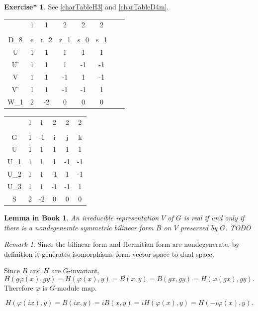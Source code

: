 \documentclass[12pt, letterpaper]{article}
\newcommand{\red}[1]{{\color{red} #1}}
\theoremstyle{definition}
\theoremstyle{remark}
\newtheorem*{rem*}{Remark}
\theoremstyle{definition}
\newtheorem{exe*}[exe]{Exercise*}
\theoremstyle{plain}
\newtheorem{llem}[exe]{Lemma in Book}
\numberwithin{equation}{section}
\begin{document}
	\begin{exe*}
		See \autoref{charTableH3} and \autoref{charTableD4m}.
		
		
		\begin{center}
			\begin{tabular}{C | C C C C C C C}
				&1&1&2&2&2\\
				\\
				D_{8}&e&r_2&r_1&s_0&s_1\\
				\hline
				U&1&1&1&1&1\\
				U'&1&1&1&-1&-1\\
				V&1&1&-1&1&-1\\
				V'&1&1&-1&-1&1\\
				W_1&2&-2&0&0&0\\
			\end{tabular}
		\end{center}
	
		\begin{center}
			\begin{tabular}{C | C C C C C }
				& 1 & 1 & 2 & 2 & 2 \\
				\\
				G& 1 & -1 & \pm i  & \pm j &  \pm k \\
				\hline
				U & 1 & 1 & 1 & 1 & 1 \\
				U_1 & 1 & 1 & 1 &-1&-1\\
				U_2 & 1 & 1 & -1&1&-1\\
				U_3 & 1 & 1 & -1&-1&1\\
				S & 2 & -2 & 0 & 0&0\\ 
			\end{tabular}
		\end{center}
	\end{exe*}

	\begin{llem}
		An irreducible representation $V$ of $G$ is real if and only if there is 
		a nondegenerate symmetric bilinear form $B$ on $V$ preserved by $G$. \red{TODO}
	\end{llem}
	\begin{rem*}
		Since the bilinear form and Hermitian form are nondegenerate,
		by definition it generates isomorphisms form vector space to dual space.
		
		Since $B$ and $H$ are $G$-invariant,
		\[H(g\varphi(x),gy)= H(\varphi(x),y)=B(x,y)=B(gx,gy)=H(\varphi(gx),gy).\]
		Therefore $\varphi$ is $G$-module map.
		
		\[H(\varphi(ix),y)=B(ix,y)=iB(x,y)=iH(\varphi(x),y)= H(-i\varphi(x),y).\]
	\end{rem*}
\end{document}
